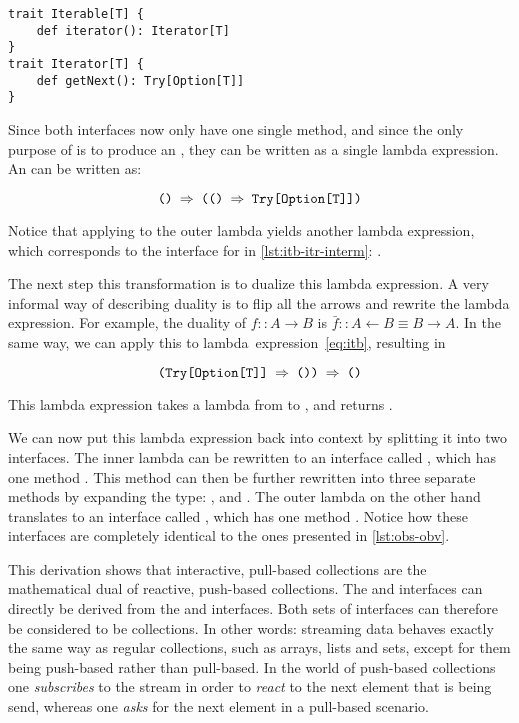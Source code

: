 \begin{lstlisting}[caption={\itr interface after applying coproduct}, label={lst:itb-itr-interm}]
trait Iterable[T] {
    def iterator(): Iterator[T]
}
trait Iterator[T] {
    def getNext(): Try[Option[T]]
}
\end{lstlisting}

Since both interfaces now only have one single method, and since the only purpose of \itb is to produce an \itr, they can be written as a single lambda expression. An \itb can be written as:

\begin{equation} \label{eq:itb}
\code{() $\Rightarrow$ (() $\Rightarrow$ Try[Option[T]])}
\end{equation}

Notice that applying  to the outer lambda yields another lambda expression, which corresponds to the interface for \itr in \autoref{lst:itb-itr-interm}: .

The next step this transformation is to dualize this lambda expression. A very informal way of describing duality is to flip all the arrows and rewrite the lambda expression. For example, the duality of $f :: A \rightarrow B$ is $\bar{f} :: A \leftarrow B \equiv B \rightarrow A$. In the same way, we can apply this to lambda~expression~\ref{eq:itb}, resulting in

\begin{equation} \label{eq:obs}
\code{(Try[Option[T]] $\Rightarrow$ ()) $\Rightarrow$ ()}
\end{equation}

This lambda expression takes a lambda from  to , and returns .

We can now put this lambda expression back into context by splitting it into two interfaces. The inner lambda can be rewritten to an interface called \obv, which has one method . This method can then be further rewritten into three separate methods by expanding the  type: ,  and . The outer lambda on the other hand translates to an interface called \obs, which has one method . Notice how these interfaces are completely identical to the ones presented in \autoref{lst:obs-obv}.

This derivation shows that interactive, pull-based collections are the mathematical dual of reactive, push-based collections. The \obs and \obv interfaces can directly be derived from the \itb and \itr interfaces. Both sets of interfaces can therefore be considered to be collections. In other words: streaming data behaves exactly the same way as regular collections, such as arrays, lists and sets, except for them being push-based rather than pull-based.  In the world of push-based collections one \emph{subscribes} to the stream in order to \emph{react} to the next element that is being send, whereas one \emph{asks} for the next element in a pull-based scenario.

